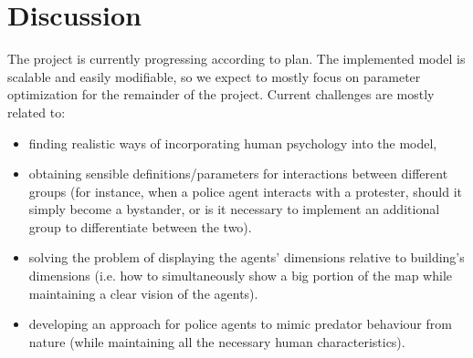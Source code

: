 \documentclass[9pt]{pnas-new}
\begin{document}
\section*{Discussion}

The project is currently progressing according to plan. The implemented model is scalable and easily modifiable, so we expect to mostly focus on parameter optimization for the remainder of the project. Current challenges are mostly related to:
\begin{itemize}
\item finding realistic ways of incorporating human psychology into the model,
\item obtaining sensible definitions/parameters for interactions between different groups (for instance, when a police agent interacts with a protester, should it simply become a bystander, or is it necessary to implement an additional group to differentiate between the two).
\item solving the problem of displaying the agents' dimensions relative to building's dimensions (i.e. how to simultaneously show a big portion of the map while maintaining a clear vision of the agents).
\item developing an approach for police agents to mimic predator behaviour from nature (while maintaining all the necessary human characteristics). 
\end{itemize}


\showacknow %


\begin{multicols}{2}
\section*{\bibname}

\end{multicols}
\end{document}
